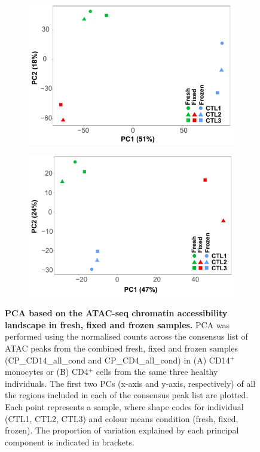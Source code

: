 \begin{figure}[htbp]
\centering
\begin{subfigure}{0.5\textwidth}
\centering
\includegraphics[width=\textwidth]{./Results1/pdfs/Core_ATAC_CD14_fresh_frozen_fixed_no_CTL1_fixed_PCA}
\caption{\textbf{}}
\end{subfigure}%
\begin{subfigure}{0.5\textwidth}
\centering
\includegraphics[width=\textwidth]{./Results1/pdfs/Core_ATAC_CD4_fresh_frozen_fixed_no_CTL1_fixed_PCA}
\caption{\textbf{}}
\end{subfigure}
\caption[PCA based on the ATAC-seq chromatin accessibility landscape in fresh, fixed and frozen samples.]{\textbf{PCA based on the ATAC-seq chromatin accessibility landscape in fresh, fixed and frozen samples.} PCA was performed using the normalised counts across the consensus list of ATAC peaks from the combined fresh, fixed and frozen samples (CP\_CD14\_all\_cond and CP\_CD4\_all\_cond) in (A) CD14$^+$ monocytes or (B) CD4$^+$ cells from the same three healthy individuals. The first two PCs (x-axis and y-axis, respectively) of all the regions included in each of the consensus peak list are plotted. Each point represents a sample, where shape codes for individual (CTL1, CTL2, CTL3) and colour means condition (fresh, fixed, frozen). The proportion of variation explained by each principal component is indicated in brackets.}
\label{figure:Core_ATAC_all_conditions_PCA}
\end{figure}




